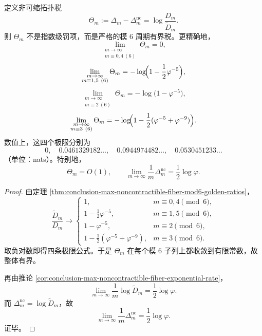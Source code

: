 \begin{theorem}\label{thm:conclusion-noncontractible-topological-tax-bounded}
定义非可缩拓扑税
\[
\Theta_m:=\Delta_m-\Delta_m^{\mathrm{nc}}=\log\frac{D_m}{\widetilde D_m}.
\]
则 \(\Theta_m\) 不是指数级罚项，而是严格的模 \(6\) 周期有界税。更精确地，
\[
\lim_{\substack{m\to\infty\\ m\equiv 0,4\ (6)}}\Theta_m=0,
\]
\[
\lim_{\substack{m\to\infty\\ m\equiv 1,5\ (6)}}\Theta_m
=
-\log\!\Bigl(1-\frac{1}{2}\varphi^{-5}\Bigr),
\]
\[
\lim_{\substack{m\to\infty\\ m\equiv 2\ (6)}}\Theta_m
=
-\log\!\bigl(1-\varphi^{-5}\bigr),
\]
\[
\lim_{\substack{m\to\infty\\ m\equiv 3\ (6)}}\Theta_m
=
-\log\!\Bigl(1-\frac12(\varphi^{-5}+\varphi^{-9})\Bigr).
\]
数值上，这四个极限分别为
\[
0,\quad 0.0461329182\ldots,\quad 0.0944974482\ldots,\quad 0.0530451233\ldots
\]
（单位：nats）。特别地，
\[
\Theta_m=O(1),
\qquad
\lim_{m\to\infty}\frac1m\Delta_m^{\mathrm{nc}}
=
\frac12\log\varphi.
\]
\end{theorem}
\begin{proof}
由定理 \ref{thm:conclusion-max-noncontractible-fiber-mod6-golden-ratios}，
\[
\frac{\widetilde D_m}{D_m}
\longrightarrow
\begin{cases}
1,& m\equiv 0,4\pmod 6,\\[2pt]
1-\frac{1}{2}\varphi^{-5},& m\equiv 1,5\pmod 6,\\[4pt]
1-\varphi^{-5},& m\equiv 2\pmod 6,\\[4pt]
1-\frac12(\varphi^{-5}+\varphi^{-9}),& m\equiv 3\pmod 6.
\end{cases}
\]
取负对数即得四条极限公式。于是 \(\Theta_m\) 在每个模 \(6\) 子列上都收敛到有限常数，故整体有界。

再由推论 \ref{cor:conclusion-max-noncontractible-fiber-exponential-rate}，
\[
\lim_{m\to\infty}\frac1m\log \widetilde D_m=\frac12\log\varphi.
\]
而 \(\Delta_m^{\mathrm{nc}}=\log \widetilde D_m\)，故
\[
\lim_{m\to\infty}\frac1m\Delta_m^{\mathrm{nc}}=\frac12\log\varphi.
\]
证毕。
\end{proof}

